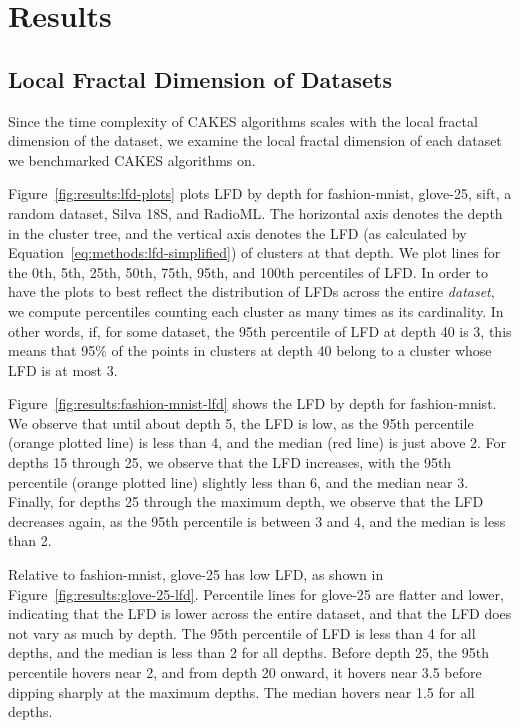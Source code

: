 \section{Results}
\label{sec:results}


\subsection{Local Fractal Dimension of Datasets}
\label{subsec:lfd-results}

Since the time complexity of CAKES algorithms scales with the local fractal dimension of the dataset, we examine the local fractal dimension of each dataset we benchmarked CAKES algorithms on. 


Figure~\ref{fig:results:lfd-plots} plots LFD by depth for fashion-mnist, glove-25, sift, a random dataset, Silva 18S, and RadioML.
The horizontal axis denotes the depth in the cluster tree, and the vertical axis denotes the LFD (as calculated by Equation~\ref{eq:methods:lfd-simplified}) of clusters at that depth.
We plot lines for the 0th, 5th, 25th, 50th, 75th, 95th, and 100th percentiles of LFD.
In order to have the plots to best reflect the distribution of LFDs across the entire \emph{dataset}, we compute percentiles counting each cluster as many times as its cardinality. 
In other words, if, for some dataset, the 95th percentile of LFD at depth 40 is 3, this means that 95\% of the points in clusters at depth 40 belong to a cluster whose LFD is at most 3.


Figure~\ref{fig:results:fashion-mnist-lfd} shows the LFD by depth for fashion-mnist. 
We observe that until about depth 5, the LFD is low, as the 95th percentile (orange plotted line) is less than 4, and the median (red line) is just above 2.
For depths 15 through 25, we observe that the LFD increases, with the 95th percentile (orange plotted line) slightly less than 6, and the median near 3.
Finally, for depths 25 through the maximum depth, we observe that the LFD decreases again, as the 95th percentile is between 3 and 4, and the median is less than 2.


Relative to fashion-mnist, glove-25 has low LFD, as shown in Figure~\ref{fig:results:glove-25-lfd}. 
Percentile lines for glove-25 are flatter and lower, indicating that the LFD is lower across the entire dataset, and that the LFD does not vary as much by depth.
The 95th percentile of LFD is less than 4 for all depths, and the median is less than 2 for all depths. 
Before depth 25, the 95th percentile hovers near 2, and from depth 20 onward, it hovers near 3.5 before dipping sharply at the maximum depths. 
The median hovers near 1.5 for all depths. 


